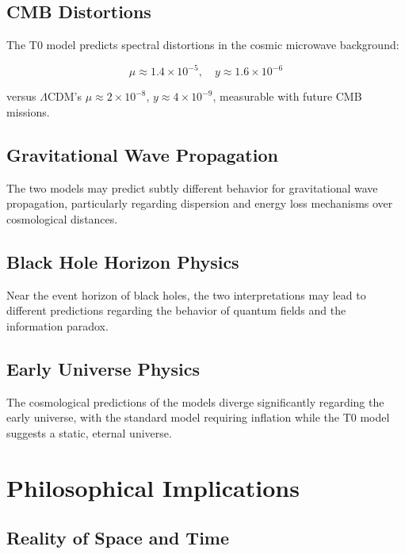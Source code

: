\documentclass[aps,prl,twocolumn,superscriptaddress,nofootinbib]{revtex4-2}
\newcommand{\LCDM}{\Lambda\text{CDM}}
\begin{document}
	\subsection{CMB Distortions}
	\label{subsec:cmb_distortions}
	
	The T0 model predicts spectral distortions in the cosmic microwave background:
	
	\begin{equation}
		\mu \approx 1.4 \times 10^{-5}, \quad y \approx 1.6 \times 10^{-6}
		\label{eq:distortion_parameters}
	\end{equation}
	
	versus $\LCDM$'s $\mu \approx 2 \times 10^{-8}$, $y \approx 4 \times 10^{-9}$, measurable with future CMB missions.
	
	\subsection{Gravitational Wave Propagation}
	\label{subsec:grav_wave_tests}
	
	The two models may predict subtly different behavior for gravitational wave propagation, particularly regarding dispersion and energy loss mechanisms over cosmological distances.
	
	\subsection{Black Hole Horizon Physics}
	\label{subsec:black_hole_tests}
	
	Near the event horizon of black holes, the two interpretations may lead to different predictions regarding the behavior of quantum fields and the information paradox.
	
	\subsection{Early Universe Physics}
	\label{subsec:early_universe_tests}
	
	The cosmological predictions of the models diverge significantly regarding the early universe, with the standard model requiring inflation while the T0 model suggests a static, eternal universe.
	
	\section{Philosophical Implications}
	\label{sec:philosophy}
	
	\subsection{Reality of Space and Time}
	\label{subsec:reality_spacetime}
	
\end{document}
